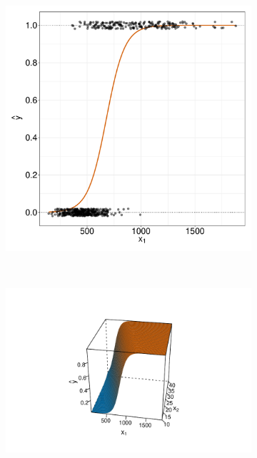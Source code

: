 \documentclass[12pt]{article}
\begin{document}
\begin{figure}[h!] 
  \begin{subfigure}[b]{0.45\linewidth}
    \centering
    \includegraphics[width=0.95\linewidth, height=1.2\textwidth]{figures/Figure-LINK-UNIVARIATE-chapt.pdf} %
    \caption{} 
  \end{subfigure}%
~
  \begin{subfigure}[b]{0.45\linewidth}
    \includegraphics[width=0.99\linewidth, angle=-5, trim={0 10 30 10}]{figures/logistic-2-features-cropped.pdf} %

\end{subfigure}
\end{figure}
\end{document}
